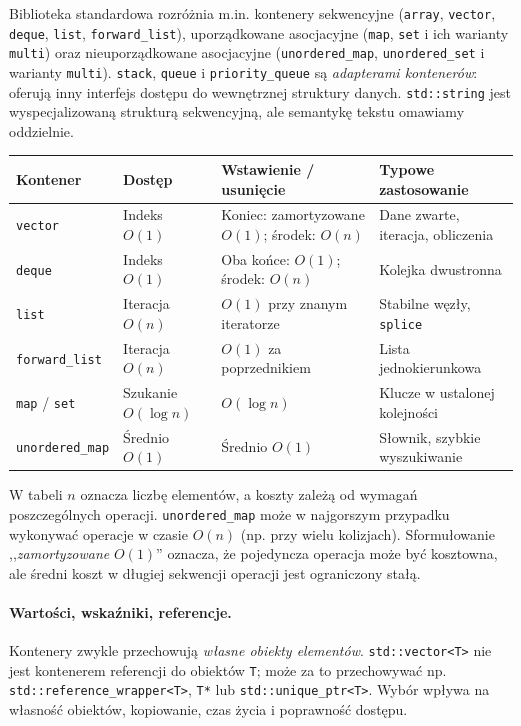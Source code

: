 Biblioteka standardowa rozróżnia m.in. kontenery sekwencyjne
(\texttt{array}, \texttt{vector}, \texttt{deque}, \texttt{list},
\texttt{forward\_list}), uporządkowane asocjacyjne (\texttt{map},
\texttt{set} i ich warianty \texttt{multi}) oraz nieuporządkowane
asocjacyjne (\texttt{unordered\_map}, \texttt{unordered\_set} i warianty
\texttt{multi}). \texttt{stack}, \texttt{queue} i \texttt{priority\_queue}
są \emph{adapterami kontenerów}: oferują inny interfejs dostępu do
wewnętrznej struktury danych. \texttt{std::string} jest wyspecjalizowaną
strukturą sekwencyjną, ale semantykę tekstu omawiamy oddzielnie.

\begin{center}
\small
\begin{tabularx}{\textwidth}{@{}lXXX@{}}
\toprule
\textbf{Kontener} & \textbf{Dostęp} & \textbf{Wstawienie / usunięcie} & \textbf{Typowe zastosowanie} \\
\midrule
\texttt{vector} & Indeks $O(1)$ & Koniec: zamortyzowane $O(1)$; środek: $O(n)$ & Dane zwarte, iteracja, obliczenia \\
\texttt{deque} & Indeks $O(1)$ & Oba końce: $O(1)$; środek: $O(n)$ & Kolejka dwustronna \\
\texttt{list} & Iteracja $O(n)$ & $O(1)$ przy znanym iteratorze & Stabilne węzły, \texttt{splice} \\
\texttt{forward\_list} & Iteracja $O(n)$ & $O(1)$ za poprzednikiem & Lista jednokierunkowa \\
\texttt{map} / \texttt{set} & Szukanie $O(\log n)$ & $O(\log n)$ & Klucze w ustalonej kolejności \\
\texttt{unordered\_map} & Średnio $O(1)$ & Średnio $O(1)$ & Słownik, szybkie wyszukiwanie \\
\bottomrule
\end{tabularx}
\end{center}

W tabeli $n$ oznacza liczbę elementów, a koszty zależą od wymagań
poszczególnych operacji. \texttt{unordered\_map} może w najgorszym
przypadku wykonywać operacje w czasie $O(n)$ (np. przy wielu kolizjach).
Sformułowanie ,,\emph{zamortyzowane} $O(1)$'' oznacza, że pojedyncza
operacja może być kosztowna, ale średni koszt w długiej sekwencji operacji
jest ograniczony stałą.

\paragraph{Wartości, wskaźniki, referencje.}
Kontenery zwykle przechowują \emph{własne obiekty elementów}.
\texttt{std::vector<T>} nie jest kontenerem referencji do obiektów
\texttt{T}; może za to przechowywać np. \texttt{std::reference\_wrapper<T>},
\texttt{T*} lub \texttt{std::unique\_ptr<T>}. Wybór wpływa na własność
obiektów, kopiowanie, czas życia i poprawność dostępu.


